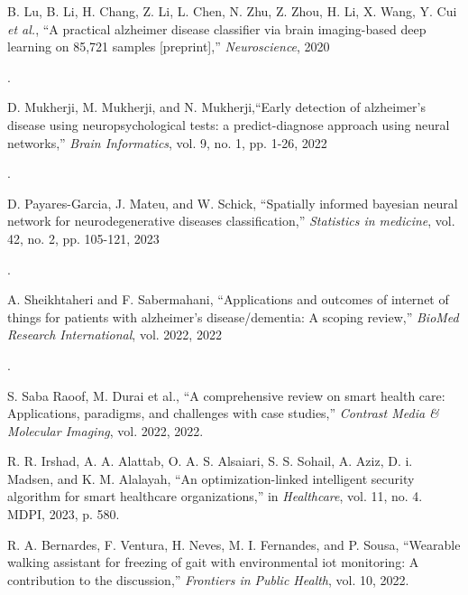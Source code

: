 \documentclass{article}
\begin{document}
\begin{multicols}{2}
\begin{minipage}[t]{0.49\textwidth}
\begin{enumerate}[label={[\arabic*]}, noitemsep]

{\fontsize{8}{7}\selectfont \item B. Lu, B. Li, H. Chang, Z. Li, L. Chen, N. Zhu, Z. Zhou, H. Li, X. Wang, Y. Cui \textit{et al.}, ``A practical alzheimer disease classifier via brain imaging-based deep learning on 85,721 samples [preprint],'' \textit{Neuroscience}, 2020}.

{\fontsize{8}{7}\selectfont \item D. Mukherji, M. Mukherji, and N. Mukherji,``Early detection of alzheimer's disease using neuropsychological tests: a predict-diagnose approach using neural networks,'' \textit{Brain Informatics}, vol. 9, no. 1, pp. 1-26, 2022}.

{\fontsize{8}{7}\selectfont \item D. Payares-Garcia, J. Mateu, and W. Schick, ``Spatially informed bayesian neural network for neurodegenerative diseases classification,'' \textit{Statistics in medicine}, vol. 42, no. 2, pp. 105-121, 2023}.

{\fontsize{8}{7}\selectfont \item A. Sheikhtaheri and F. Sabermahani, ``Applications and outcomes of internet of things for patients with alzheimer's disease/dementia: A scoping review,'' \textit{BioMed Research International}, vol. 2022, 2022}.

{\fontsize{8}{7}\selectfont \item S. Saba Raoof, M. Durai et al., ``A comprehensive review on smart health care: Applications, paradigms, and challenges with case studies,'' \textit{Contrast Media \& Molecular Imaging}, vol. 2022, 2022.}

{\fontsize{8}{7}\selectfont \item R. R. Irshad, A. A. Alattab, O. A. S. Alsaiari, S. S. Sohail, A. Aziz, D. i. Madsen, and K. M. Alalayah, ``An optimization-linked intelligent security algorithm for smart healthcare organizations,'' in \textit{Healthcare}, vol. 11, no. 4. MDPI, 2023, p. 580.}

{\fontsize{8}{7}\selectfont \item R. A. Bernardes, F. Ventura, H. Neves, M. I. Fernandes, and P. Sousa, ``Wearable walking assistant for freezing of gait with environmental iot monitoring: A contribution to the discussion,'' \textit{Frontiers in Public Health}, vol. 10, 2022.}
\end{enumerate}

\end{minipage}


\end{multicols}
\end{document}
